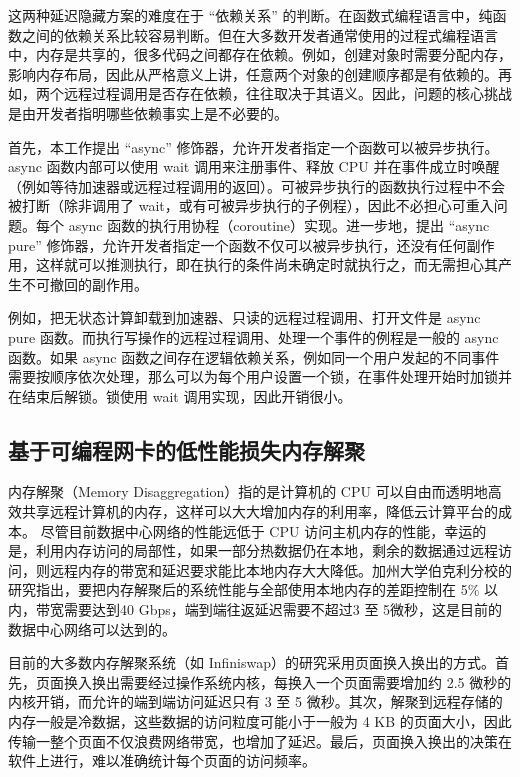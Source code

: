 这两种延迟隐藏方案的难度在于 ``依赖关系'' 的判断。在函数式编程语言中，纯函数之间的依赖关系比较容易判断。但在大多数开发者通常使用的过程式编程语言中，内存是共享的，很多代码之间都存在依赖。例如，创建对象时需要分配内存，影响内存布局，因此从严格意义上讲，任意两个对象的创建顺序都是有依赖的。再如，两个远程过程调用是否存在依赖，往往取决于其语义。因此，问题的核心挑战是由开发者指明哪些依赖事实上是不必要的。

首先，本工作提出 ``async'' 修饰器，允许开发者指定一个函数可以被异步执行。async 函数内部可以使用 wait 调用来注册事件、释放 CPU 并在事件成立时唤醒（例如等待加速器或远程过程调用的返回）。可被异步执行的函数执行过程中不会被打断（除非调用了 wait，或有可被异步执行的子例程），因此不必担心可重入问题。每个 async 函数的执行用协程（coroutine）实现。进一步地，提出 ``async pure'' 修饰器，允许开发者指定一个函数不仅可以被异步执行，还没有任何副作用，这样就可以推测执行，即在执行的条件尚未确定时就执行之，而无需担心其产生不可撤回的副作用。

例如，把无状态计算卸载到加速器、只读的远程过程调用、打开文件是 async pure 函数。而执行写操作的远程过程调用、处理一个事件的例程是一般的 async 函数。如果 async 函数之间存在逻辑依赖关系，例如同一个用户发起的不同事件需要按顺序依次处理，那么可以为每个用户设置一个锁，在事件处理开始时加锁并在结束后解锁。锁使用 wait 调用实现，因此开销很小。

\subsection{基于可编程网卡的低性能损失内存解聚}

内存解聚（Memory Disaggregation）指的是计算机的 CPU 可以自由而透明地高效共享远程计算机的内存，这样可以大大增加内存的利用率，降低云计算平台的成本。
尽管目前数据中心网络的性能远低于 CPU 访问主机内存的性能，幸运的是，利用内存访问的局部性，如果一部分热数据仍在本地，剩余的数据通过远程访问，则远程内存的带宽和延迟要求能比本地内存大大降低。加州大学伯克利分校的研究指出，要把内存解聚后的系统性能与全部使用本地内存的差距控制在 5\% 以内，带宽需要达到40 Gbps，端到端往返延迟需要不超过3 至 5微秒，这是目前的数据中心网络可以达到的。

目前的大多数内存解聚系统（如 Infiniswap）的研究采用页面换入换出的方式。首先，页面换入换出需要经过操作系统内核，每换入一个页面需要增加约 2.5 微秒的内核开销，而允许的端到端访问延迟只有 3 至 5 微秒。其次，解聚到远程存储的内存一般是冷数据，这些数据的访问粒度可能小于一般为 4 KB 的页面大小，因此传输一整个页面不仅浪费网络带宽，也增加了延迟。最后，页面换入换出的决策在软件上进行，难以准确统计每个页面的访问频率。

